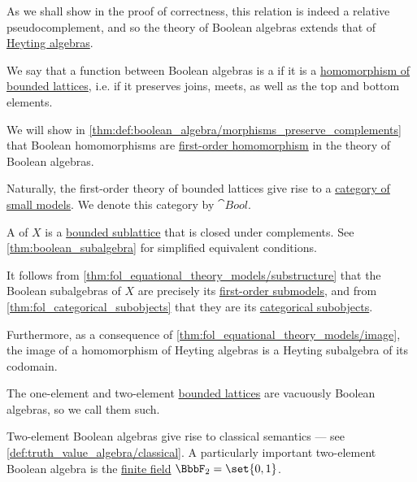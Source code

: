\begin{definition}
\begin{thmenum}
\begin{thmenum}[resume=def:boolean_algebra/theory]
      As we shall show in the proof of correctness, this relation is indeed a relative pseudocomplement, and so the theory of Boolean algebras extends that of \hyperref[def:heyting_algebra]{Heyting algebras}.
    \end{thmenum}

     We say that a function between Boolean algebras is a  if it is a \hyperref[def:bounded_lattice]{homomorphism of bounded lattices}, i.e. if it preserves joins, meets, as well as the top and bottom elements.

    We will show in \cref{thm:def:boolean_algebra/morphisms_preserve_complements} that Boolean homomorphisms are \hyperref[def:fol_homomorphism]{first-order homomorphism} in the theory of Boolean algebras.

     Naturally, the first-order theory of bounded lattices give rise to a \hyperref[def:fol_theory_model_functor/obj]{category of small models}. We denote this category by \( \cat{Bool} \).

     A  of \( X \) is a \hyperref[def:bounded_lattice/subobject]{bounded sublattice} that is closed under complements. See \cref{thm:boolean_subalgebra} for simplified equivalent conditions.

    It follows from \cref{thm:fol_equational_theory_models/substructure} that the Boolean subalgebras of \( X \) are precisely its \hyperref[def:fol_substructure/submodel]{first-order submodels}, and from \cref{thm:fol_categorical_subobjects} that they are its \hyperref[def:categorical_subobject]{categorical subobjects}.

    Furthermore, as a consequence of \cref{thm:fol_equational_theory_models/image}, the image of a homomorphism of Heyting algebras is a Heyting subalgebra of its codomain.

    \mimprovised The one-element and two-element \hyperref[def:bounded_lattice/trivial]{bounded lattices} are vacuously Boolean algebras, so we call them such.

    Two-element Boolean algebras give rise to classical semantics --- see \cref{def:truth_value_algebra/classical}. A particularly important two-element Boolean algebra is the \hyperref[def:finite_field]{finite field} \( \BbbF_2 = \set{ 0, 1 } \).


\end{thmenum}
\end{definition}
